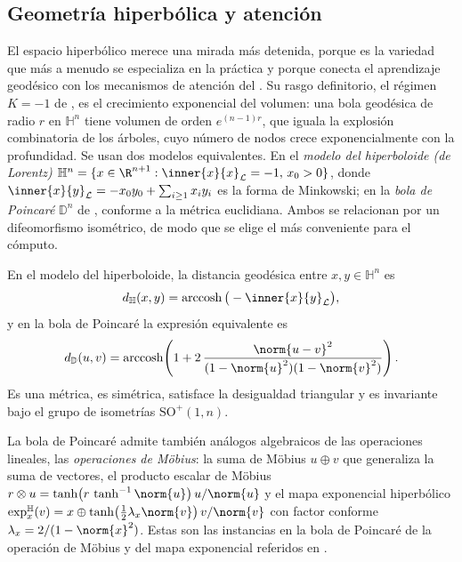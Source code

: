 \subsection{Geometr\'ia hiperb\'olica y atenci\'on}
\label{subsec:geo:hyperbolic}

El espacio hiperb\'olico merece una mirada m\'as detenida, porque es la variedad
que m\'as a menudo se especializa en la pr\'actica y porque conecta el
aprendizaje geod\'esico con los mecanismos de atenci\'on del .
Su rasgo definitorio, el r\'egimen $K = -1$ de , es el
crecimiento exponencial del volumen: una bola geod\'esica de radio $r$ en
$\mathbb{H}^n$ tiene volumen de orden $e^{(n-1)r}$, que iguala la explosi\'on
combinatoria de los \'arboles, cuyo n\'umero de nodos crece exponencialmente con
la profundidad. Se usan dos modelos equivalentes. En el \emph{modelo del
hiperboloide (de Lorentz)} $\mathbb{H}^n = \{x \in \R^{n+1} :
\inner{x}{x}_{\mathcal L} = -1,\, x_0 > 0\}$, donde
$\inner{x}{y}_{\mathcal L} = -x_0 y_0 + \sum_{i\ge 1} x_i y_i$ es la forma de
Minkowski; en la \emph{bola de Poincar\'e} $\mathbb{D}^n$ de
, conforme a la m\'etrica euclidiana. Ambos se relacionan
por un difeomorfismo isom\'etrico, de modo que se elige el m\'as conveniente para
el c\'omputo.

\begin{definition}
\label{def:geo:hyperbolic-distance}
En el modelo del hiperboloide, la distancia geod\'esica entre
$x, y \in \mathbb{H}^n$ es
\[
  d_{\mathbb{H}}(x,y) = \operatorname{arccosh}\big(-\inner{x}{y}_{\mathcal L}\big),
\]
y en la bola de Poincar\'e la expresi\'on equivalente es
\[
  d_{\mathbb{D}}(u,v) = \operatorname{arccosh}\!\left(
    1 + 2\,\frac{\norm{u-v}^2}{(1 - \norm{u}^2)(1 - \norm{v}^2)}\right).
\]
Es una m\'etrica, es sim\'etrica, satisface la desigualdad triangular y es
invariante bajo el grupo de isometr\'ias $\mathrm{SO}^+(1,n)$.
\end{definition}

La bola de Poincar\'e admite tambi\'en an\'alogos algebraicos de las operaciones
lineales, las \emph{operaciones de M\"obius}: la suma de M\"obius
$u \oplus v$ que generaliza la suma de vectores, el producto escalar de M\"obius
$r \otimes u = \tanh\!\big(r\,\tanh^{-1}\norm{u}\big)\,u/\norm{u}$ y el mapa
exponencial hiperb\'olico
$\exp^{\mathbb{H}}_x(v) = x \oplus \tanh\!\big(\tfrac{1}{2}\lambda_x\norm{v}\big)
\,v/\norm{v}$ con factor conforme $\lambda_x = 2/(1-\norm{x}^2)$. Estas son las
instancias en la bola de Poincar\'e de la operaci\'on de M\"obius y del mapa
exponencial referidos en .

